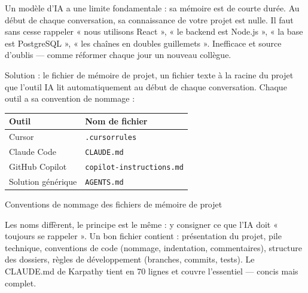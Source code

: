 


Un modèle d'IA a une limite fondamentale : sa mémoire est de courte durée. Au début de chaque conversation, sa connaissance de votre projet est nulle. Il faut sans cesse rappeler « nous utilisons React », « le backend est Node.js », « la base est PostgreSQL », « les chaînes en doubles guillemets ». Inefficace et source d'oublis — comme réformer chaque jour un nouveau collègue.

Solution : le fichier de mémoire de projet, un fichier texte à la racine du projet que l'outil IA lit automatiquement au début de chaque conversation. Chaque outil a sa convention de nommage :

\begin{center}
\begin{tabularx}{\linewidth}{|X|X|}
\hline
\textbf{Outil} & \textbf{Nom de fichier} \tabularnewline
\hline
Cursor & \texttt{.\allowbreak cursorrules} \tabularnewline
Claude Code & \texttt{CLAUDE.\allowbreak md} \tabularnewline
GitHub Copilot & \texttt{copilot-\allowbreak instructions.\allowbreak md} \tabularnewline
Solution générique & \texttt{AGENTS.\allowbreak md} \tabularnewline
\hline
\end{tabularx}
\end{center}

\begin{center}\small\color{gray}Conventions de nommage des fichiers de mémoire de projet\end{center}

Les noms diffèrent, le principe est le même : y consigner ce que l'IA doit « toujours se rappeler ». Un bon fichier contient : présentation du projet, pile technique, conventions de code (nommage, indentation, commentaires), structure des dossiers, règles de développement (branches, commits, tests). Le CLAUDE.md de Karpathy tient en 70 lignes et couvre l'essentiel — concis mais complet.

